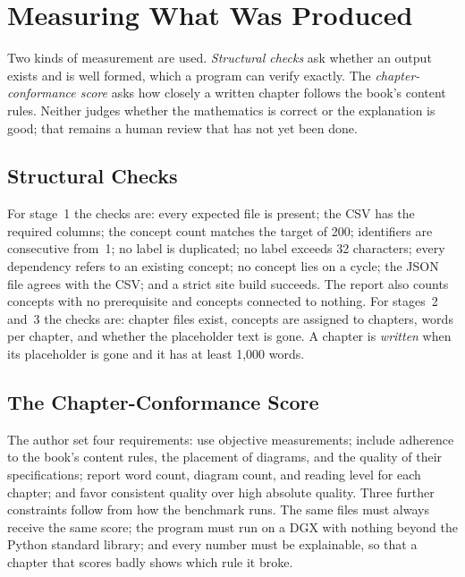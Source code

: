 \section{Measuring What Was Produced}
\label{sec:measurement}

Two kinds of measurement are used. \textit{Structural checks} ask whether an output exists and is well formed, which a program can verify exactly. The \textit{chapter-conformance score} asks how closely a written chapter follows the book's content rules. Neither judges whether the mathematics is correct or the explanation is good; that remains a human review that has not yet been done.

\subsection{Structural Checks}

For stage~1 the checks are: every expected file is present; the CSV has the required columns; the concept count matches the target of 200; identifiers are consecutive from~1; no label is duplicated; no label exceeds 32 characters; every dependency refers to an existing concept; no concept lies on a cycle; the JSON file agrees with the CSV; and a strict site build succeeds. The report also counts concepts with no prerequisite and concepts connected to nothing. For stages~2 and~3 the checks are: chapter files exist, concepts are assigned to chapters, words per chapter, and whether the placeholder text is gone. A chapter is \textit{written} when its placeholder is gone and it has at least 1,000 words.

\subsection{The Chapter-Conformance Score}

The author set four requirements: use objective measurements; include adherence to the book's content rules, the placement of diagrams, and the quality of their specifications; report word count, diagram count, and reading level for each chapter; and favor consistent quality over high absolute quality. Three further constraints follow from how the benchmark runs. The same files must always receive the same score; the program must run on a DGX with nothing beyond the Python standard library; and every number must be explainable, so that a chapter that scores badly shows which rule it broke.

